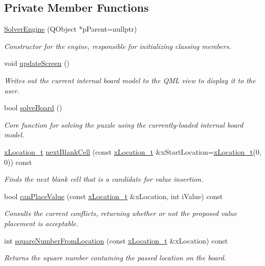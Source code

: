 \subsection*{Private Member Functions}
\begin{DoxyCompactItemize}
\item 
\mbox{\hyperlink{class_solver_engine_a76b66694da6f16000f3d9e268d87a74f}{Solver\+Engine}} (Q\+Object $\ast$p\+Parent=nullptr)
\begin{DoxyCompactList}\small\item\em Constructor for the engine, responsible for initializing classing members. \end{DoxyCompactList}\item 
void \mbox{\hyperlink{class_solver_engine_a24a236b02f997c594c259d15167e32d1}{update\+Screen}} ()
\begin{DoxyCompactList}\small\item\em Writes out the current internal board model to the Q\+ML view to display it to the user. \end{DoxyCompactList}\item 
bool \mbox{\hyperlink{class_solver_engine_a8c1f32f617ef8c5b83c4bef56e7dc89a}{solve\+Board}} ()
\begin{DoxyCompactList}\small\item\em Core function for solving the puzzle using the currently-\/loaded internal board model. \end{DoxyCompactList}\item 
\mbox{\hyperlink{struct_solver_engine_1_1x_location__t}{x\+Location\+\_\+t}} \mbox{\hyperlink{class_solver_engine_a27aa053eb5e2a7abb602b7763ec6dea8}{next\+Blank\+Cell}} (const \mbox{\hyperlink{struct_solver_engine_1_1x_location__t}{x\+Location\+\_\+t}} \&x\+Start\+Location=\mbox{\hyperlink{struct_solver_engine_1_1x_location__t}{x\+Location\+\_\+t}}(0, 0)) const
\begin{DoxyCompactList}\small\item\em Finds the next blank cell that is a candidate for value insertion. \end{DoxyCompactList}\item 
bool \mbox{\hyperlink{class_solver_engine_a7e9939f155549012b8be1bb854eba5c3}{can\+Place\+Value}} (const \mbox{\hyperlink{struct_solver_engine_1_1x_location__t}{x\+Location\+\_\+t}} \&x\+Location, int i\+Value) const
\begin{DoxyCompactList}\small\item\em Consults the current conflicts, returning whether or not the proposed value placement is acceptable. \end{DoxyCompactList}\item 
int \mbox{\hyperlink{class_solver_engine_a3b515701f25827a9d817e7ca529f9b80}{square\+Number\+From\+Location}} (const \mbox{\hyperlink{struct_solver_engine_1_1x_location__t}{x\+Location\+\_\+t}} \&x\+Location) const
\begin{DoxyCompactList}\small\item\em Returns the square number containing the passed location on the board. \end{DoxyCompactList}\end{DoxyCompactItemize}
